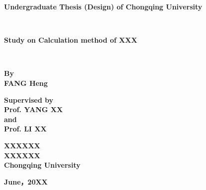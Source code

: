 \cleardoublepage
\pagestyle{empty}
\setmainfont{Times New Roman}
\begin{center}
\textbf{
Undergraduate Thesis (Design) of Chongqing University}
\end{center}
~\\
\begin{center}
\textbf{
Study on Calculation method of XXX }
\end{center}

~\\
\renewcommand{\headrulewidth}{1pt}
\begin{figure}[htb] 
  \centering
     \end{figure}
     

\setmainfont{Times New Roman}
\begin{center}
\textbf{By}  \\
\textbf{FANG Heng }
\end{center}

\begin{center}
\textbf{Supervised by}\\
\textbf{Prof. YANG XX}\\
\textbf{and}\\
\textbf{Prof. LI XX}
\end{center}

\begin{center}
\textbf{XXXXXX}\\ %
\textbf{XXXXXX}\\ %
\textbf{Chongqing University}
\end{center}

\begin{center}
\textbf{June，20XX}
\end{center}